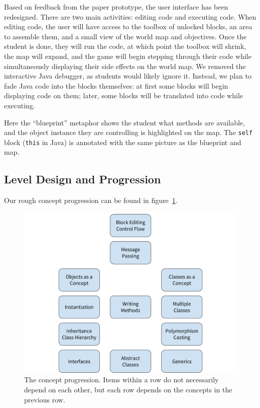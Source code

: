 \documentclass[12pt,notitlepage]{article}
\begin{document}
Based on feedback from the paper prototype, the user interface has
been redesigned. There are two main activities: editing code and
executing code. When editing code, the user will have access to the
toolbox of unlocked blocks, an area to assemble them, and a small view
of the world map and objectives. Once the student is done, they will
run the code, at which point the toolbox will shrink, the map will
expand, and the game will begin stepping through their code while
simultaneously displaying their side effects on the world map. We
removed the interactive Java debugger, as students would likely ignore
it. Instead, we plan to fade Java code into the blocks themselves: at
first some blocks will begin displaying code on them; later, some
blocks will be translated into code while executing.

Here the ``blueprint'' metaphor shows the student what methods are
available, and the object instance they are controlling is highlighted
on the map. The \texttt{self} block (\texttt{this} in Java) is
annotated with the same picture as the blueprint and map.

\subsection{Level Design and Progression}

Our rough concept progression can be found in figure~\ref{fig:progression}.

\begin{figure}[h]
  \centering
  \includegraphics[width=\textwidth]{concept_progression.pdf}
  \caption{The concept progression. Items within a row do not
    necessarily depend on each other, but each row depends on the
    concepts in the previous row.}\label{fig:progression}
\end{figure}
\end{document}
